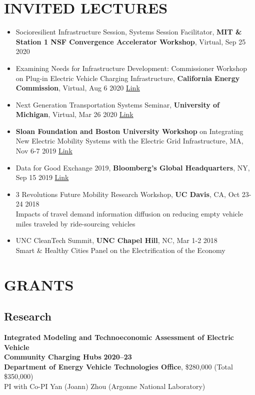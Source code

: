 \documentclass[margin,line]{resume}
\begin{document}
\begin{resume}
\section{\mysidestyle \bf INVITED LECTURES}
  \begin{itemize}
  \item Socioresilient Infrastructure Session, Systems Session Facilitator, \textbf{MIT \& Station 1 NSF Convergence Accelerator Workshop}, Virtual, Sep 25 2020
  \item Examining Needs for Infrastructure Development: Commissioner Workshop on Plug-in Electric Vehicle Charging Infrastructure, \textbf{California Energy Commission}, Virtual, Aug 6 2020 \href{https://www.energy.ca.gov/event/workshop/2020-08/session-4-examining-needs-infrastructure-development-commissioner-workshop}{Link}
  \item Next Generation Transportation Systems Seminar, \textbf{University of Michigan}, Virtual, Mar 26 2020 \href{https://events.umich.edu/event/70249}{Link}
  \item \textbf{Sloan Foundation and Boston University Workshop} on Integrating New Electric Mobility Systems with the Electric Grid Infrastructure, MA, Nov 6-7 2019 \href{http://www.bu.edu/systems/sloan-foundation-november-6-2019-agenda-day-1/}{Link}
  \item Data for Good Exchange 2019, \textbf{Bloomberg's Global Headquarters}, NY, Sep 15 2019 \href{https://www.techatbloomberg.com/blog/data-for-good-exchange-2019-preview-people-track/}{Link}
    \item 3 Revolutions Future Mobility Research Workshop, \textbf{UC Davis}, CA, Oct 23-24 2018\\
Impacts of travel demand information diffusion on reducing empty vehicle miles traveled by ride-sourcing vehicles
\item UNC CleanTech Summit, \textbf{UNC Chapel Hill}, NC, Mar 1-2 2018\\
Smart \& Healthy Cities Panel on the Electrification of the Economy
\end{itemize}


\section{\mysidestyle \bf GRANTS}
    \vspace{-0.2in}
    \subsection{\mysidestyle \bf Research}
       \vspace{-0.2in}
     \textbf{Integrated Modeling and Technoeconomic Assessment of Electric Vehicle \\ Community Charging Hubs}  \hfill \textbf{2020--23}\vspace{-0mm}\\\vspace{-0mm}%
 {\bf Department of Energy Vehicle Technologies Office}, \$280,000 (Total \$350,000) \\
 PI with Co-PI Yan (Joann) Zhou (Argonne National Laboratory)
 

\end{resume}
\end{document}

